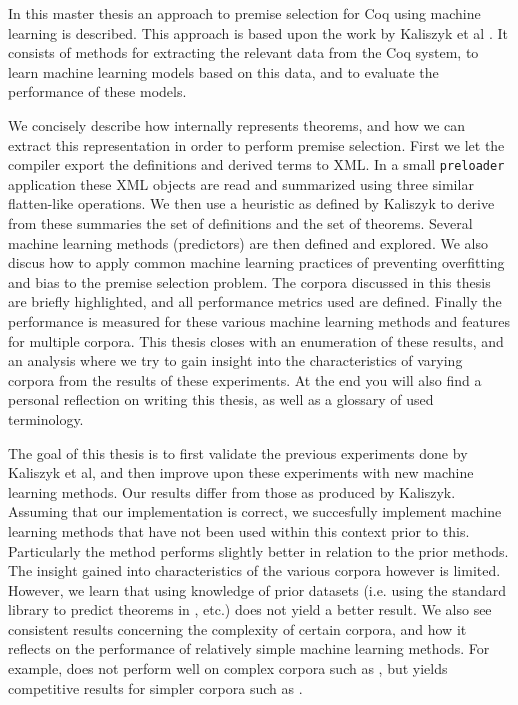 In this master thesis an approach to premise selection for Coq using machine learning is described.
This approach is based upon the work by Kaliszyk et al \cite{kaliszyk2014machine}.
It consists of methods for extracting the relevant data from the Coq system, to learn
machine learning models based on this data, and to evaluate the performance of these models.

We concisely describe how \coq internally represents theorems, and how we can extract this representation in order to perform premise selection.
First we let the \coq compiler export the definitions and derived terms to XML.
In a small \texttt{preloader} application these XML objects are read and summarized using three similar flatten-like operations.
We then use a heuristic as defined by Kaliszyk \cite{kaliszyk2014machine} to derive from these summaries
the set of definitions and the set of theorems.
Several machine learning methods (predictors) are then defined and explored.
We also discus how to apply common machine learning practices of preventing overfitting and bias to the premise selection problem.
The corpora discussed in this thesis are briefly highlighted, and all performance metrics used are defined.
Finally the performance is measured for these various machine learning methods and features for multiple \coq corpora.
This thesis closes with an enumeration of these results,
and an analysis where we try to gain insight into the characteristics of varying corpora from the results of these experiments.
At the end you will also find a personal reflection on writing this thesis, as well as a glossary of used terminology.

The goal of this thesis is to first validate the previous experiments done by Kaliszyk et al,
and then improve upon these experiments with new machine learning methods.
Our results differ from those as produced by Kaliszyk.
Assuming that our implementation is correct, we succesfully implement machine learning methods that have not been used within
this context prior to this.
Particularly the \adarank method performs slightly better in relation to the prior methods.
The insight gained into characteristics of the various corpora however is limited.
However, we learn that using knowledge of prior datasets (i.e. using the \coq standard library to predict theorems in \corn, etc.)
does not yield a better result.
We also see consistent results concerning the complexity of certain corpora, and how it reflects on the performance
of relatively simple machine learning methods.
For example, \knnadaptive does not perform well on complex corpora such as \corn, but yields competitive results for
simpler corpora such as \formalin.
 